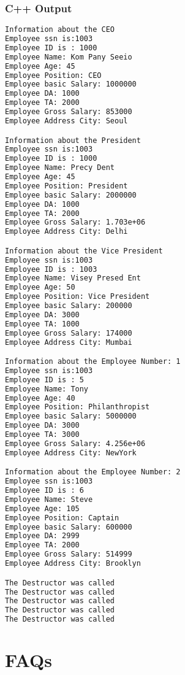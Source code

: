\documentclass[11pt]{article}
\begin{document}
\subsubsection{C++ Output}
\begin{lstlisting}[language=bash, caption=C++ Output]
Information about the CEO
Employee ssn is:1003
Employee ID is : 1000
Employee Name: Kom Pany Seeio
Employee Age: 45
Employee Position: CEO
Employee basic Salary: 1000000
Employee DA: 1000
Employee TA: 2000
Employee Gross Salary: 853000
Employee Address City: Seoul

Information about the President
Employee ssn is:1003
Employee ID is : 1000
Employee Name: Precy Dent
Employee Age: 45
Employee Position: President
Employee basic Salary: 2000000
Employee DA: 1000
Employee TA: 2000
Employee Gross Salary: 1.703e+06
Employee Address City: Delhi

Information about the Vice President
Employee ssn is:1003
Employee ID is : 1003
Employee Name: Visey Presed Ent
Employee Age: 50
Employee Position: Vice President
Employee basic Salary: 200000
Employee DA: 3000
Employee TA: 1000
Employee Gross Salary: 174000
Employee Address City: Mumbai

Information about the Employee Number: 1
Employee ssn is:1003
Employee ID is : 5
Employee Name: Tony
Employee Age: 40
Employee Position: Philanthropist
Employee basic Salary: 5000000
Employee DA: 3000
Employee TA: 3000
Employee Gross Salary: 4.256e+06
Employee Address City: NewYork

Information about the Employee Number: 2
Employee ssn is:1003
Employee ID is : 6
Employee Name: Steve
Employee Age: 105
Employee Position: Captain
Employee basic Salary: 600000
Employee DA: 2999
Employee TA: 2000
Employee Gross Salary: 514999
Employee Address City: Brooklyn

The Destructor was called
The Destructor was called
The Destructor was called
The Destructor was called
The Destructor was called
\end{lstlisting}

\pagebreak

\section{FAQs}
\end{document}
